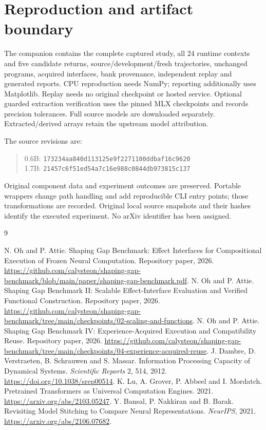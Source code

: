 \documentclass[11pt]{article}
\begin{document}
\section{Reproduction and artifact boundary}
The companion contains the complete captured study, all 24 runtime contexts and five candidate returns, source/development/fresh trajectories, unchanged programs, acquired interfaces, bank provenance, independent replay and generated reports. CPU reproduction needs NumPy; reporting additionally uses Matplotlib. Replay needs no original checkpoint or hosted service. Optional guarded extraction verification uses the pinned MLX checkpoints and records precision tolerances. Full source models are downloaded separately. Extracted/derived arrays retain the upstream model attribution.

The source revisions are:
\begin{quote}\small
0.6B: \texttt{173234aa840d113125e9f2271100ddbaf16c9620}\\
1.7B: \texttt{21457c6f51ed54a7c16e988c0844db973815c137}
\end{quote}
Original component data and experiment outcomes are preserved. Portable wrappers change path handling and add reproducible CLI entry points; those transformations are recorded. Original local source snapshots and their hashes identify the executed experiment. No arXiv identifier has been assigned.

\clearpage
\begin{thebibliography}{9}\small\setlength{\itemsep}{2pt}\raggedright
{} N. Oh and P. Attie. Shaping Gap Benchmark: Effect Interfaces for Compositional Execution of Frozen Neural Computation. Repository paper, 2026. \url{https://github.com/calysteon/shaping-gap-benchmark/blob/main/paper/shaping-gap-benchmark.pdf}.
 N. Oh and P. Attie. Shaping Gap Benchmark II: Scalable Effect-Interface Evaluation and Verified Functional Construction. Repository paper, 2026. \url{https://github.com/calysteon/shaping-gap-benchmark/tree/main/checkpoints/02-scaling-and-functions}.
 N. Oh and P. Attie. Shaping Gap Benchmark IV: Experience-Acquired Execution and Compatibility Reuse. Repository paper, 2026. \url{https://github.com/calysteon/shaping-gap-benchmark/tree/main/checkpoints/04-experience-acquired-reuse}.
 J. Dambre, D. Verstraeten, B. Schrauwen and S. Massar. Information Processing Capacity of Dynamical Systems. \emph{Scientific Reports} 2, 514, 2012. \url{https://doi.org/10.1038/srep00514}.
 K. Lu, A. Grover, P. Abbeel and I. Mordatch. Pretrained Transformers as Universal Computation Engines. 2021. \url{https://arxiv.org/abs/2103.05247}.
 Y. Bansal, P. Nakkiran and B. Barak. Revisiting Model Stitching to Compare Neural Representations. \emph{NeurIPS}, 2021. \url{https://arxiv.org/abs/2106.07682}.
\end{thebibliography}
\end{document}
